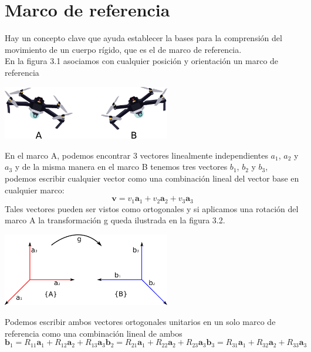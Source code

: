 \section{Marco de referencia}
Hay un concepto clave que ayuda establecer la bases para la comprensión del movimiento de
un cuerpo rígido, que es el de marco de referencia.\\
En la figura 3.1 asociamos con cualquier posición y orientación un marco de referencia
\begin{center}
	\includegraphics[width=0.55\textwidth]{Contenido/Cuerpo/Capitulo3/Fig10.eps}
	\label{fig:ModeloMat:Fig1}
\end{center}
En el marco A, podemos encontrar 3 vectores linealmente independientes $a_1$, $a_2$ y $a_3$
y de la misma manera en el marco B tenemos tres vectores $b_1$, $b_2$ y $b_3$, podemos
escribir cualquier vector como una combinación lineal del vector base en cualquier marco:
\begin{equation}
	\textbf{v} = v_1 \textbf{a}_1 + v_2 \textbf{a}_2 + v_3 \textbf{a}_3
\end{equation}
Tales vectores pueden ser vistos como ortogonales y si aplicamos una rotación del marco A
la transformación g queda ilustrada en la figura 3.2.
\begin{center}
	\includegraphics[width=0.55\textwidth]{Contenido/Cuerpo/Capitulo3/Fig11.eps}
	\label{fig:ModeloMat:Fig1}
\end{center}
Podemos escribir ambos vectores ortogonales unitarios en un solo marco de referencia como
una combinación lineal de ambos
\begin{subequations}
	\begin{equation}
		\textbf{b}_1 = R_{11}\textbf{a}_1 + R_{12}\textbf{a}_2 + R_{13}\textbf{a}_3
	\end{equation}
	\begin{equation}
		\textbf{b}_2 = R_{21}\textbf{a}_1 + R_{22}\textbf{a}_2 + R_{23}\textbf{a}_3
	\end{equation}
	\begin{equation}
		\textbf{b}_3 = R_{31}\textbf{a}_1 + R_{32}\textbf{a}_2 + R_{33}\textbf{a}_3
	\end{equation}
\end{subequations}
